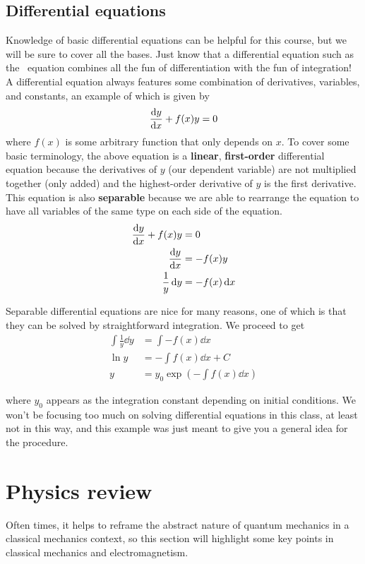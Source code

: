 \subsection{Differential equations}
Knowledge of basic differential equations can be helpful for this course, but we will be sure to cover all the bases. Just know that a differential equation such as the \Sch\ equation combines all the fun of differentiation with the fun of integration! A differential equation always features some combination of derivatives, variables, and constants, an example of which is given by \[ \dv{y}{x} + f(x)y = 0 \] 
where $f(x)$ is some arbitrary function that only depends on $x$. To cover some basic terminology, the above equation is a \textbf{linear}, \textbf{first-order} differential equation because the derivatives of $y$ (our dependent variable) are not multiplied together (only added) and the highest-order derivative of $y$ is the first derivative. This equation is also \textbf{separable} because we are able to rearrange the equation to have all variables of the same type on each side of the equation.
\begin{align*}
\dv{y}{x} + f(x)y &= 0 \\
\dv{y}{x} &= -f(x)y \\
\frac{1}{y}\dd{y} &= -f(x)\dd{x}
\end{align*}

Separable differential equations are nice for many reasons, one of which is that they can be solved by straightforward integration. We proceed to get
\begin{align*}
\int\frac{1}{y}\dd{y} &= \int-f(x)\dd{x} \\
\ln y &= -\int f(x)\dd{x} + C \\
y &= y_0\exp\left(-\int f(x)\dd{x}\right)
\end{align*}

where $y_0$ appears as the integration constant depending on initial conditions. We won't be focusing too much on solving differential equations in this class, at least not in this way, and this example was just meant to give you a general idea for the procedure.


\section{Physics review}
Often times, it helps to reframe the abstract nature of quantum mechanics in a classical mechanics context, so this section will highlight some key points in classical mechanics and electromagnetism. \par 

